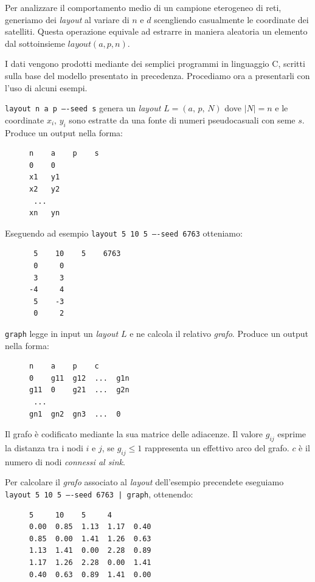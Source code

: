 \documentclass[a4paper,12pt]{article}
\theoremstyle{definition}
\begin{document}
Per analizzare il comportamento medio di un campione eterogeneo di reti, generiamo dei \emph{layout} al variare di $n$ e $d$ scengliendo casualmente le coordinate dei satelliti. Questa operazione equivale ad estrarre in maniera aleatoria un elemento dal sottoinsieme $layout(a, p, n)$.

I dati vengono prodotti mediante dei semplici programmi in linguaggio C, scritti sulla base del modello presentato in precedenza. Procediamo ora a presentarli con l'uso di alcuni esempi.

\texttt{layout n a p ----seed s} genera un \emph{layout} $L = (a,\,p,\,N)$ dove $|N| = n$ e le coordinate $x_i,\,y_i$ sono estratte da una fonte di numeri pseudocasuali con seme $s$. Produce un output nella forma:

\begin{figure}[H]
\centering
\begin{BVerbatim}
n    a    p    s
0    0
x1   y1
x2   y2
 ...
xn   yn
\end{BVerbatim}
\end{figure}

Eseguendo ad esempio \texttt{layout 5 10 5 ----seed 6763} otteniamo:

\begin{figure}[H]
\centering
\begin{BVerbatim}
 5    10    5    6763
 0     0
 3     3
-4     4
 5    -3
 0     2
\end{BVerbatim}
\end{figure}

\texttt{graph} legge in input un \emph{layout} $L$ e ne calcola il relativo \emph{grafo}. Produce un output nella forma:

\begin{figure}[H]
\centering
\begin{BVerbatim}
n    a    p    c
0    g11  g12  ...  g1n
g11  0    g21  ...  g2n
 ...
gn1  gn2  gn3  ...  0
\end{BVerbatim}
\end{figure}

Il grafo è codificato mediante la sua matrice delle adiacenze. Il valore $g_{ij}$ esprime la distanza tra i nodi $i$ e $j$, se $g_{ij} \leq 1$ rappresenta un effettivo arco del grafo. $c$ è il numero di nodi \emph{connessi al sink}.

Per calcolare il \emph{grafo} associato al \emph{layout} dell'esempio precendete eseguiamo \texttt{layout 5 10 5 ----seed 6763 | graph}, ottenendo:

\begin{figure}[H]
\centering
\begin{BVerbatim}
5     10    5     4
0.00  0.85  1.13  1.17  0.40
0.85  0.00  1.41  1.26  0.63
1.13  1.41  0.00  2.28  0.89
1.17  1.26  2.28  0.00  1.41
0.40  0.63  0.89  1.41  0.00
\end{BVerbatim}
\end{figure}
\end{document}
